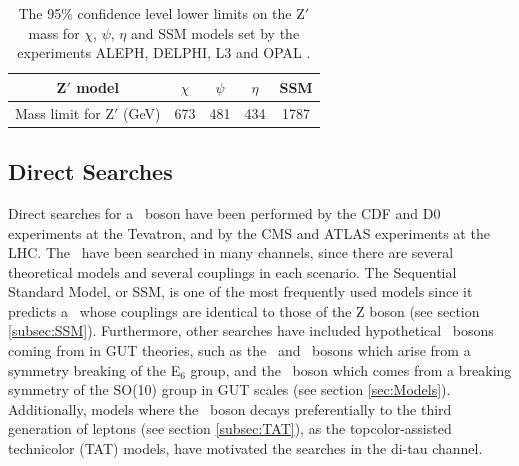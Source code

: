  \begin{table}[ht]
\begin{center}
\begin{tabular}{|c|c|c|c|c|}
  \hline
  Z$'$ model                        &  $\chi$ & $\psi$ & $\eta$ & SSM  \\ \hline\hline
  Mass limit for Z$'$ (GeV)         &   673   &   481  &   434  & 1787 \\
  \hline
\end{tabular}
\end{center}
\caption{The 95$\%$ confidence level lower limits on the Z$'$ mass for $\chi$, $\psi$, $\eta$ and SSM models
set by the experiments ALEPH, DELPHI, L3 and OPAL \cite{LEP2}.}\label{LEPZprime}
\end{table}

\subsection{Direct Searches}
\label{subsec:DirectSearches}

Direct searches for a \Zprime~boson have been performed by the CDF \cite{CDFZprimedielectronbib,CDFZprimedimuonbib,CDFZprimeditaubib,CDFZprimeditopbib}
and D0 \cite{D0Zprimesearchesbib,D0Zprimetodielectronbib,D0Zprimeditopbib} experiments at the Tevatron, and 
by the CMS \cite{CMSZprimetodileptonrun1run2, CMSZprimetodileptonrun1, CMSZprimetodileptonrun1sqrt7, CMSZprimetotautaurun1, CMSZprimetotautauemu, 
CMSZprimetotautau2015, CMSZprimeto4leptons, CMSZprimeHplusZ, CMSZprimetotoptoprun1, CMSZprimetodibjetsrun1, CMSZprimedijetrun2} and
ATLAS \cite{ATLASZprimetodileptonrun2, ATLASZprimetodilepton2015, ATLASZprimetodilepton2012, ATLASZprimetodileptonrun1, ATLASZprimetotautau2016,
ATLASZprimetotautau2015, ATLASZprimetotautaurun1, ATLASZprimetotautau2011, ATLASZprimetojet2015, ATLASZprimetobjet2015} experiments at
the LHC. The \Zprime~have been searched in many channels, since there are several theoretical models and several couplings in 
each scenario. The Sequential Standard Model, or SSM, is one of the most frequently used models since it predicts 
a \ZprimeSSM~whose couplings are identical to those of the Z boson (see section \ref{subsec:SSM}). Furthermore,  other searches
have included hypothetical \Zprime~bosons coming from in GUT theories, such as the \Zprimepsi~and \Zprimechi~bosons which arise 
from a symmetry breaking of the E$_{6}$ group, and the \Zprimeeta~boson which comes from a breaking symmetry of 
the SO(10) group in GUT scales (see section \ref{sec:Models}). Additionally, models where the \Zprime~boson decays 
preferentially to the third generation of leptons (see section \ref{subsec:TAT}), as the topcolor-assisted 
technicolor (TAT) models, have motivated the searches in the di-tau channel.\\

